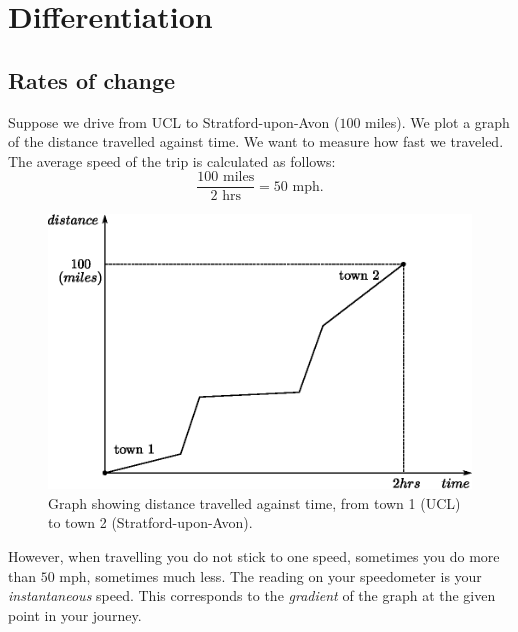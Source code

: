 %

\chapter{Differentiation}
\section{Rates of change}

Suppose we drive from UCL to Stratford-upon-Avon ($100$ miles). We plot a graph of the distance travelled against time. We want to measure how fast we traveled. The average speed of the trip is calculated as follows:
\begin{equation*}
\frac{100\text{ miles}}{2 \text{ hrs}}=50\text{ mph}.
\end{equation*}

\begin{figure}[H]
\centering
\includegraphics[scale=0.75]{img/distance-time-graph}
\caption{Graph showing distance travelled against time, from town 1 (UCL) to town 2 (Stratford-upon-Avon).}
\label{fig:distance-time-graph}
\end{figure}

However, when travelling you do not stick to one speed, sometimes you do more than $50$ mph, sometimes much less. The reading on your speedometer is your {\it instantaneous} speed. This corresponds to the {\it gradient} of the graph at the given point in your journey.

